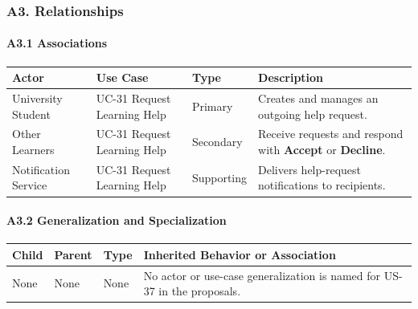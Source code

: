 \documentclass[12pt]{article}
\renewcommand{\baselinestretch}{1.5}
\begin{document}
\hypertarget{sec:a3-relationships}{}
\subsubsection*{A3. Relationships}
\par\medskip

\hypertarget{sec:a3-1-associations}{}
\paragraph*{A3.1 Associations}
\par\medskip

\begingroup
\small
\renewcommand{\baselinestretch}{1.0}\selectfont
\renewcommand{\arraystretch}{1.15}
\setlength{\tabcolsep}{6pt}
\begin{longtable}{|>{\raggedright\arraybackslash}p{}|>{\raggedright\arraybackslash}p{}|>{\raggedright\arraybackslash}p{}|>{\raggedright\arraybackslash}p{}|}
\hline
\textbf{Actor} & \textbf{Use Case} & \textbf{Type} & \textbf{Description} \\ \hline
\endhead
University Student & UC-31 Request Learning Help & Primary & Creates and manages an outgoing help request. \\ \hline
Other Learners & UC-31 Request Learning Help & Secondary & Receive requests and respond with \textbf{Accept} or \textbf{Decline}. \\ \hline
Notification Service & UC-31 Request Learning Help & Supporting & Delivers help-request notifications to recipients. \\ \hline
\end{longtable}
\endgroup
\par\medskip

\hypertarget{sec:a3-2-generalization-and-specialization}{}
\paragraph*{A3.2 Generalization and Specialization}
\par\medskip

\begingroup
\small
\renewcommand{\baselinestretch}{1.0}\selectfont
\renewcommand{\arraystretch}{1.15}
\setlength{\tabcolsep}{6pt}
\begin{longtable}{|>{\raggedright\arraybackslash}p{}|>{\raggedright\arraybackslash}p{}|>{\raggedright\arraybackslash}p{}|>{\raggedright\arraybackslash}p{}|}
\hline
\textbf{Child} & \textbf{Parent} & \textbf{Type} & \textbf{Inherited Behavior or Association} \\ \hline
\endhead
None & None & None & No actor or use-case generalization is named for US-37 in the proposals. \\ \hline
\end{longtable}
\endgroup
\par\medskip
\end{document}
